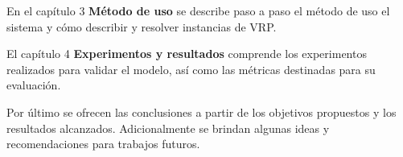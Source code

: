 En el capítulo 3 \textbf{Método de uso} se describe paso a paso el método de uso el sistema y cómo describir y resolver instancias de VRP.

El capítulo 4 \textbf{Experimentos y resultados} comprende los experimentos realizados para validar el modelo, así como las métricas destinadas para su evaluación. 

Por último se ofrecen las conclusiones a partir de los objetivos propuestos y los resultados alcanzados. Adicionalmente se brindan algunas ideas y recomendaciones para trabajos futuros.





